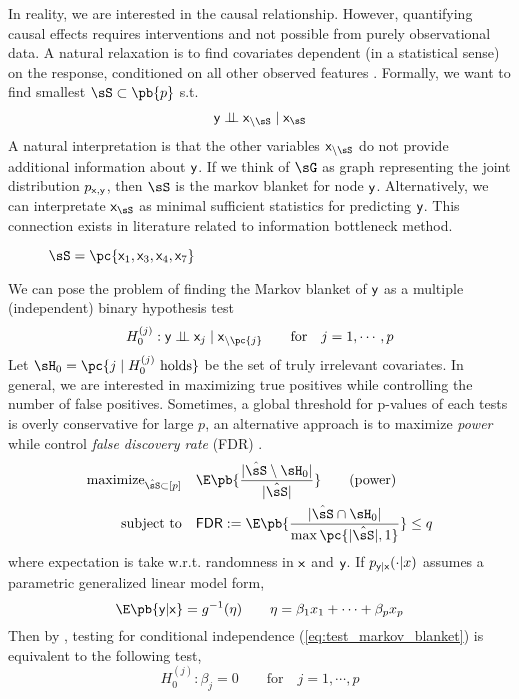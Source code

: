 \documentclass[11pt]{article}
\begin{document}
In reality, we are interested in the causal relationship. However, quantifying causal effects requires interventions and not possible from purely observational data. A natural relaxation is to find covariates dependent (in a statistical sense) on the response, conditioned on all other observed features \cite{gimenezKnockoffsMassNew2019}. Formally, we want to find smallest $\sS\subset\pb{p}$ s.t.
\begin{align*}
    \ry \dperp \rx_{\setminus\sS} \mid \rx_{\sS} 
\end{align*} 
A natural interpretation is that the other variables $\rx_{\setminus\sS}$ do not provide additional information about $\mathsf{y}$. If we think of $\sG$ as graph representing the joint distribution $p_{\mathsf{x},\mathsf{y}}$, then $\sS$ is the markov blanket for node $\mathsf{y}$. Alternatively, we can interpretate $\rx_{\sS}$ as minimal sufficient statistics for predicting $\mathsf{y}$. This connection exists in literature related to information bottleneck method.
\begin{figure}[h!]
    \caption{$\sS =\pc{\rx_1,\rx_3,\rx_4,\rx_7}$}
\end{figure}
We can pose the problem of finding the Markov blanket of $\mathsf{y}$ as a multiple (independent) binary hypothesis test
\begin{align} 
    H_0^{(j)}:
        \ry \dperp \rx_j \mid \rx_{\setminus \pc{j}} 
    \quad\quad\text{for}\quad
        j = 1,\cdots,p
    \label{eq:test_markov_blanket}
\end{align}
Let $\sH_0 = \pc{j \mid H_0^{(j)} \text{ holds}}$ be the set of truly irrelevant covariates. In general, we are interested in maximizing true positives while controlling the number of false positives. Sometimes, a global threshold for p-values of each tests is overly conservative for large $p$, an alternative approach is to maximize \textit{power} while control \textit{false discovery rate} (\textsf{FDR}) \cite{benjaminiControllingFalseDiscovery1995}.
\begin{align}
    \text{maximize}_{\hat{\sS}\subset [p]}\quad
        &\E\pb{\frac{ |\hat{\sS} \setminus \sH_0| }{ |\hat{\sS}| }} \nonumber 
            \tag{power} \\
    \text{subject to}\quad
        &\textsf{FDR} := \E\pb{ \frac{ |\hat{\sS} \cap \sH_0| }{ \max\pc{|\hat{\sS}|,1} } } \leq q
    \label{eq:opt_fdr_control}
\end{align}
where expectation is take w.r.t. randomness in $\mathsf{x}$ and $\mathsf{y}$. If $p_{\mathsf{y}|\mathsf{x}}(\cdot|x)$ assumes a parametric generalized linear model form, 
\[
    \E\pb{\ry|\rx} = g^{-1}(\eta)
    \quad\quad
    \eta = \beta_1 x_1 + \cdots + \beta_p x_p    
\]
Then by \cite{candesPanningGoldModelX2017}, testing for conditional independence (\ref{eq:test_markov_blanket}) is equivalent to the following test,
\[
    H_0^{(j)}:
        \beta_j = 0
    \quad\quad\text{for}\quad
        j = 1,\cdots,p
    \label{test_glm}
\]
\end{document}
